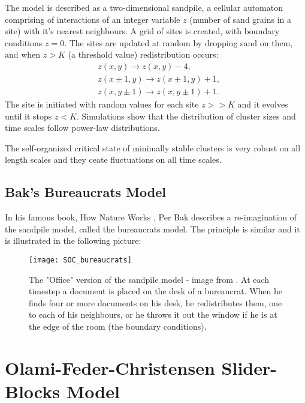 The model is described as a two-dimensional sandpile, a cellular automaton comprising of interactions of an integer variable $z$ (number of sand grains in a site) with it's nearest neighbours. A grid of sites is created, with boundary conditions $z=0$. The sites are updated at random by dropping sand on them, and when $z>K$ (a threshold value) redistribution occurs:
\begin{align}
&z(x,y) \to z(x,y)-4, \\
&z(x\pm 1,y) \to z(x \pm 1,y)+1, \\
&z(x,y\pm 1) \to z(x,y\pm 1)+1.
\end{align}
The site is initiated with random values for each site $z>>K$ and it evolves until it stops $z<K$. Simulations show that the distribution of cluster sizes and time scales follow power-law distributions.\par 
The self-organized critical state of minimally stable clusters is very robust on all length scales and they ceate fluctuations on all time scales.



\subsection{Bak's Bureaucrats Model}
In his famous book, How Nature Works \cite{natureworks}, Per Bak describes a re-imagination of the sandpile model, called the bureaucrats model. The principle is similar and it is illustrated in the following picture:

\begin{figure}[!h]
  \centering
  \texttt{[image: SOC\_bureaucrats]}
  \caption{The "Office" version of the sandpile model - image from \cite{natureworks}. At each timestep a document is placed on the desk of a bureaucrat. When he finds four or more documents on his desk, he redistributes them, one to each of his neighbours, or he throws it out the window if he is at the edge of the room (the boundary conditions).}
  \label{fig:bureaucrats}
\end{figure}


\section{Olami-Feder-Christensen Slider-Blocks Model }

